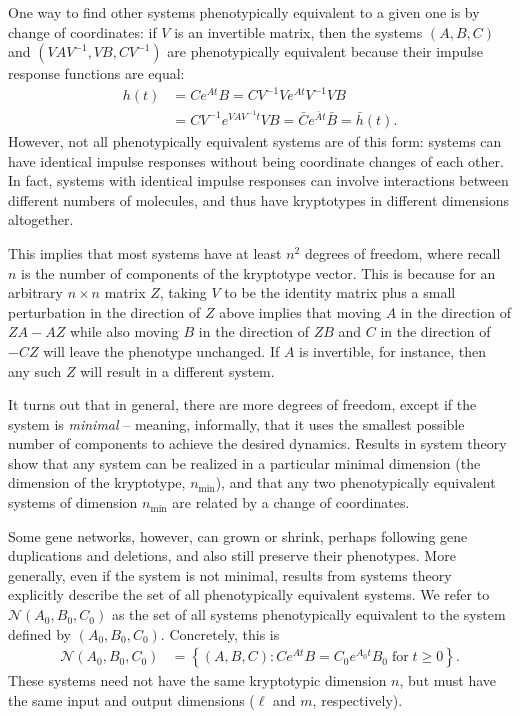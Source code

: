 \documentclass{article}
\newcommand{\1}{\mathbbm{1}}
\newcommand{\Sys}{\mathcal{S}}
\newcommand{\allS}{\mathcal{N}}
\begin{document}
One way to find other systems phenotypically equivalent to a given one
is by change of coordinates:
if $V$ is an invertible matrix, then the systems $(A,B,C)$ and $(VAV^{-1},VB,CV^{-1})$
are phenotypically equivalent because their impulse response functions are equal:
  \begin{equation}
    \begin{aligned}
      h(t) &= C e^{A t} B 
      = C V^{-1} V e^{A t} V^{-1} V B \\
      &= C V^{-1} e^{V A V^{-1} t} V B 
      = \bar{C} e^{\bar{A} t} \bar{B} = \bar h(t).
    \end{aligned}
  \end{equation}
However, not all phenotypically equivalent systems are of this form:
systems can have identical impulse responses without being coordinate changes of each other.
In fact, systems with identical impulse responses can involve interactions between different
numbers of molecules, and thus 
have kryptotypes in
different dimensions altogether.

This implies that most systems have at least $n^2$ degrees of freedom,
where recall $n$ is the number of components of the kryptotype vector.
This is because for an arbitrary $n \times n$ matrix $Z$,
taking $V$ to be the identity matrix plus a small perturbation in the direction of $Z$
above implies that
moving $A$ in the direction of $ZA - AZ$
while also moving $B$ in the direction of $ZB$ 
and $C$ in the direction of $-CZ$
will leave the phenotype unchanged.
If $A$ is invertible, for instance,
then any such $Z$ will result in a different system.

It turns out that in general, there are more degrees of freedom,
except if the system is \emph{minimal} -- meaning, informally, that it uses the smallest possible number of components
to achieve the desired dynamics.
Results in system theory show that any system can be realized in a particular minimal dimension
(the dimension of the kryptotype, $n_\text{min}$),
and that any two phenotypically equivalent systems of dimension $n_\text{min}$ are related by a change of coordinates.

Some gene networks, however, can grown or shrink, perhaps following gene duplications and deletions, 
and also still preserve their phenotypes.
More generally, even if the system is not minimal, 
results from systems theory %
explicitly describe the set of all phenotypically equivalent systems.
We refer to $\allS(A_0,B_0,C_0)$ as the set of all systems phenotypically equivalent
to the system defined by $(A_0, B_0, C_0)$.
Concretely, this is
\begin{equation} \label{eqn:equivalence}
  \begin{aligned}
    \allS(A_0, B_0, C_0) 
      &= \left\{
        (A,B,C) : C e^{At} B = C_0 e^{A_0 t} B_0 \; \text{for}\; t \ge 0 
      \right\}  .
  \end{aligned}
\end{equation}
These systems need not have the same kryptotypic dimension $n$,
but must have the same input and output dimensions ($\ell$ and $m$, respectively).
\end{document}
